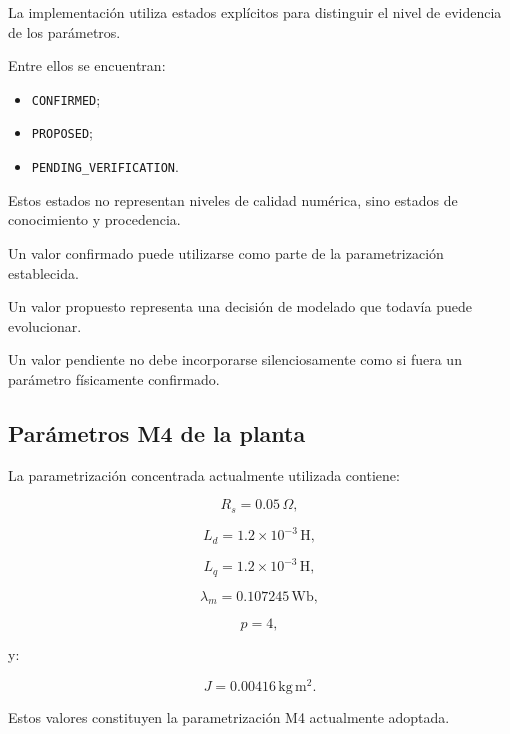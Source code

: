 La implementación utiliza estados explícitos para distinguir el nivel de evidencia de los parámetros.

Entre ellos se encuentran:

\begin{itemize}
    \item \texttt{CONFIRMED};
    \item \texttt{PROPOSED};
    \item \texttt{PENDING\_VERIFICATION}.
\end{itemize}

Estos estados no representan niveles de calidad numérica, sino estados de conocimiento y procedencia.

Un valor confirmado puede utilizarse como parte de la parametrización establecida.

Un valor propuesto representa una decisión de modelado que todavía puede evolucionar.

Un valor pendiente no debe incorporarse silenciosamente como si fuera un parámetro físicamente confirmado.

\subsection{Parámetros M4 de la planta}

La parametrización concentrada actualmente utilizada contiene:

\begin{equation}
R_s=0.05\,\Omega,
\end{equation}

\begin{equation}
L_d=1.2\times10^{-3}\,\mathrm{H},
\end{equation}

\begin{equation}
L_q=1.2\times10^{-3}\,\mathrm{H},
\end{equation}

\begin{equation}
\lambda_m=0.107245\,\mathrm{Wb},
\end{equation}

\begin{equation}
p=4,
\end{equation}

y:

\begin{equation}
J=0.00416\,\mathrm{kg\,m^2}.
\end{equation}

Estos valores constituyen la parametrización M4 actualmente adoptada.

